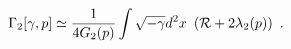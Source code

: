 \begin{equation}\label{1.17}
\Gamma_2[\gamma,p]\simeq{1 \over 4G_2(p)} \int\sqrt{-\gamma} d^2x
~\left({\cal R}+2\lambda_2(p)\right)~.
\end{equation}

